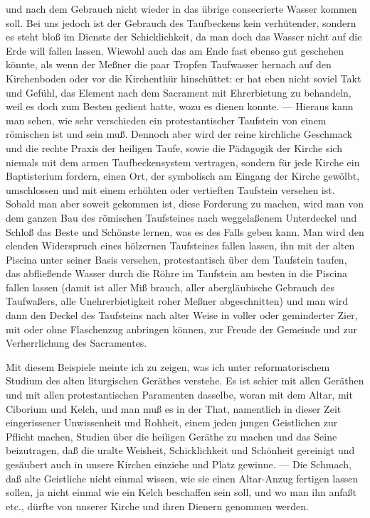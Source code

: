 und nach dem Gebrauch nicht wieder in das übrige consecrierte Wasser kommen soll. Bei uns jedoch ist der Gebrauch des Taufbeckens kein verhütender, sondern es steht bloß im Dienste der Schicklichkeit, da man doch das Wasser nicht auf die Erde will fallen lassen. Wiewohl auch das am Ende fast ebenso gut geschehen könnte, als wenn der Meßner die paar Tropfen Taufwasser hernach auf den Kirchenboden oder vor die Kirchenthür hinschüttet: er hat eben nicht soviel Takt und Gefühl, das Element nach dem Sacrament mit Ehrerbietung zu behandeln, weil es doch zum Besten gedient hatte, wozu es dienen konnte. — Hieraus kann man sehen, wie sehr verschieden ein protestantischer Taufstein von einem römischen ist und sein muß. Dennoch aber wird der reine kirchliche Geschmack und die rechte Praxis der heiligen Taufe, sowie die Pädagogik der Kirche sich niemals mit dem armen Taufbeckensystem vertragen, sondern für jede Kirche ein Baptisterium fordern, einen Ort, der symbolisch am Eingang der Kirche gewölbt, umschlossen und mit einem erhöhten oder vertieften Taufstein versehen ist. Sobald man aber soweit gekommen ist, diese Forderung zu machen, wird man von dem ganzen Bau des römischen Taufsteines nach weggelaßenem Unterdeckel und Schloß das Beste und Schönste lernen, was es des Falls geben kann. Man wird den elenden Widerspruch eines hölzernen Taufsteines fallen lassen, ihn mit der alten Piscina unter seiner Basis versehen, protestantisch über dem Taufstein taufen, das abfließende Wasser durch die Röhre im Taufstein am besten in die Piscina fallen lassen (damit ist aller Miß%
brauch, aller abergläubische Gebrauch des Taufwaßers, alle Unehrerbietigkeit roher Meßner abgeschnitten) und man wird dann den Deckel des Taufsteins nach alter Weise in voller oder geminderter Zier, mit oder ohne Flaschenzug anbringen können, zur Freude der Gemeinde und zur Verherrlichung des Sacramentes.

Mit diesem Beispiele meinte ich zu zeigen, was ich unter reformatorischem Studium des alten liturgischen Geräthes verstehe. Es ist schier mit allen Geräthen und mit allen protestantischen Paramenten dasselbe, woran mit dem Altar, mit Ciborium und Kelch, und man muß es in der That, namentlich in dieser Zeit eingerissener Unwissenheit und Rohheit, einem jeden jungen Geistlichen zur Pflicht machen, Studien über die heiligen Geräthe zu machen und das Seine beizutragen, daß die uralte Weisheit, Schicklichkeit und Schönheit gereinigt und gesäubert auch in unsere Kirchen einziehe und Platz gewinne. — Die Schmach, daß alte Geistliche nicht einmal wissen, wie sie einen Altar-Anzug fertigen lassen sollen, ja nicht einmal wie ein Kelch beschaffen sein soll, und wo man ihn anfaßt etc., dürfte von unserer Kirche und ihren Dienern genommen werden.

